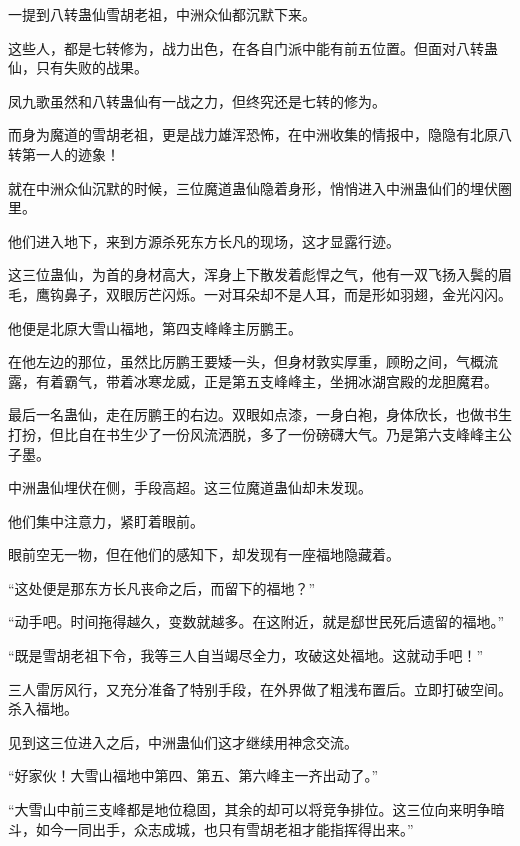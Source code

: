 
\begin{this_body}

一提到八转蛊仙雪胡老祖，中洲众仙都沉默下来。

这些人，都是七转修为，战力出色，在各自门派中能有前五位置。但面对八转蛊仙，只有失败的战果。

凤九歌虽然和八转蛊仙有一战之力，但终究还是七转的修为。

而身为魔道的雪胡老祖，更是战力雄浑恐怖，在中洲收集的情报中，隐隐有北原八转第一人的迹象！

就在中洲众仙沉默的时候，三位魔道蛊仙隐着身形，悄悄进入中洲蛊仙们的埋伏圈里。

他们进入地下，来到方源杀死东方长凡的现场，这才显露行迹。

这三位蛊仙，为首的身材高大，浑身上下散发着彪悍之气，他有一双飞扬入鬓的眉毛，鹰钩鼻子，双眼厉芒闪烁。一对耳朵却不是人耳，而是形如羽翅，金光闪闪。

他便是北原大雪山福地，第四支峰峰主厉鹏王。

在他左边的那位，虽然比厉鹏王要矮一头，但身材敦实厚重，顾盼之间，气概流露，有着霸气，带着冰寒龙威，正是第五支峰峰主，坐拥冰湖宫殿的龙胆魔君。

最后一名蛊仙，走在厉鹏王的右边。双眼如点漆，一身白袍，身体欣长，也做书生打扮，但比自在书生少了一份风流洒脱，多了一份磅礴大气。乃是第六支峰峰主公子墨。

中洲蛊仙埋伏在侧，手段高超。这三位魔道蛊仙却未发现。

他们集中注意力，紧盯着眼前。

眼前空无一物，但在他们的感知下，却发现有一座福地隐藏着。

“这处便是那东方长凡丧命之后，而留下的福地？”

“动手吧。时间拖得越久，变数就越多。在这附近，就是郄世民死后遗留的福地。”

“既是雪胡老祖下令，我等三人自当竭尽全力，攻破这处福地。这就动手吧！”

三人雷厉风行，又充分准备了特别手段，在外界做了粗浅布置后。立即打破空间。杀入福地。

见到这三位进入之后，中洲蛊仙们这才继续用神念交流。

“好家伙！大雪山福地中第四、第五、第六峰主一齐出动了。”

“大雪山中前三支峰都是地位稳固，其余的却可以将竞争排位。这三位向来明争暗斗，如今一同出手，众志成城，也只有雪胡老祖才能指挥得出来。”


\end{this_body}
